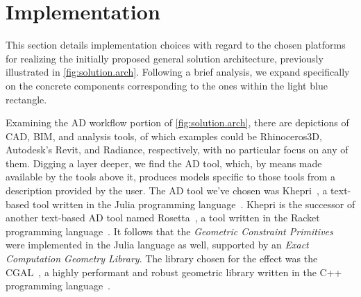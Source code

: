 \section{Implementation}%
\label{sec:solution.impl}

This section details implementation choices with regard to the chosen platforms
for realizing the initially proposed general solution architecture, previously
illustrated in \cref{fig:solution.arch}. Following a brief analysis, we expand
specifically on the concrete components corresponding to the ones within the
light blue rectangle.

Examining the \ac{AD} workflow portion of \cref{fig:solution.arch}, there are
depictions of \ac{CAD}, \ac{BIM}, and analysis tools, of which examples could be
Rhinoceros3D, Autodesk's Revit, and Radiance, respectively, with no particular
focus on any of them.  Digging a layer deeper, we find the \ac{AD} tool, which,
by means made available by the tools above it, produces models specific to those
tools from a description provided by the user.  The \ac{AD} tool we've chosen
was Khepri~\cite{Leitao:2018:Khepri.jl,Leitao:2019:GRUGEAV}, a text-based tool
written in the Julia programming language~\cite{Bezanson:2017:JAFANC}.  Khepri
is the successor of another text-based \ac{AD} tool named
Rosetta~\cite{Leitao:2011:PGDCAD}, a tool written in the Racket programming
language~\cite{PLT:2010:Reference}.  It follows that the \textit{Geometric
Constraint Primitives} were implemented in the Julia language as well, supported
by an \textit{Exact Computation Geometry Library}.  The library chosen for the
effect was the \acf{CGAL}~\cite{CGAL:2018}, a highly performant and robust
geometric library written in the C++ programming
language~\cite{Stroustrup:2013:CPP}.

